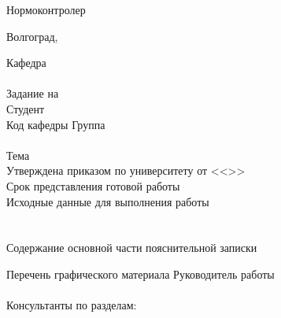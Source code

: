{{Нормоконтролер 
\hfill
{}\\
\vspace{\fill}
\begin{center}
Волгоград,~\the\year
\end{center}
\newpage
{
\clearpage
\thispagestyle{empty}
\begin{center}
\VSTUTitleHeading
\end{center}
Кафедра~\uline{\VSTUDepartment\hfill}\\
\vfill
\hfill\VSTUTitleHeadApproval
\vspace{\fill}
\\Задание на \\
Студент \\
Код кафедры \uline{\makebox[4cm]{\VSTUDepartmentCode}} \hfill Группа \uline{\makebox[4cm]{\VSTUStudentGroup}}\\
\vspace{1mm}\\
Тема \VSTUTitleUL\\
Утверждена приказом по университету от <<\uline{\makebox[0.5cm]{\VSTUOrderDate}}>> \uline{\makebox[1.8cm]{\VSTUOrderMonth}} \uline{\makebox[1.2cm]{\VSTUOrderYear}} \textnumero\uline{\makebox[1.9cm]{\VSTUOrderNumber}}\\
Срок представления готовой работы \\
Исходные данные для выполнения работы\\
\VSTUInitialDataUL\\
\vspace{4mm}\\
Содержание основной части пояснительной записки
{\small
\VSTUPZContents
}
\thispagestyle{empty}
\addtocounter{page}{-1}
\noindent Перечень графического материала
{\small
\VSTUPZGraphics
}
\vspace{\fill}
\thispagestyle{empty}
\noindent Руководитель работы 
\hfill
{}\\\\
Консультанты по разделам:\\
}}}
